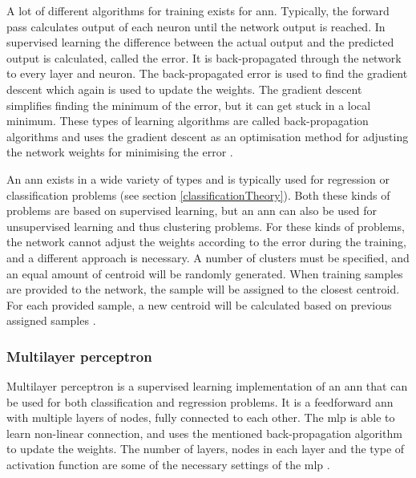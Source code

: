 \documentclass[english, a4paper]{report}
\begin{document}
{{{            \par    
            A lot of different algorithms for training exists for \gls{ann}. Typically, the forward pass calculates output of each neuron until the network output is reached. In supervised learning the difference between the actual output and the predicted output is calculated, called the error. It is back-propagated through the network to every layer and neuron. The back-propagated error is used to find the gradient descent which again is used to update the weights. The gradient descent simplifies finding the minimum of the error, but it can get stuck in a local minimum. These types of learning algorithms are called back-propagation algorithms and uses the gradient descent as an optimisation method for adjusting the network weights for minimising the error \cite{makeNeuralNetwork}.
            \par
            An \gls{ann} exists in a wide variety of types and is typically used for regression or classification problems (see section \ref{classificationTheory}). Both these kinds of problems are based on supervised learning, but an \gls{ann} can also be used for unsupervised learning and thus clustering problems. For these kinds of problems, the network cannot adjust the weights according to the error during the training, and a different approach is necessary. A number of clusters must be specified, and an equal amount of centroid will be randomly generated. When training samples are provided to the network, the sample will be assigned to the closest centroid. For each provided sample, a new centroid will be calculated based on previous assigned samples \cite{artificialIntelligence}.
            
            \subsubsection{Multilayer perceptron}\label{mlp}
            {
                Multilayer perceptron is a supervised learning implementation of an \gls{ann} that can be used for both classification and regression problems. It is a feedforward \gls{ann} with multiple layers of nodes, fully connected to each other. The \gls{mlp} is able to learn non-linear connection, and uses the mentioned back-propagation algorithm to update the weights. The number of layers, nodes in each layer and the type of activation function are some of the necessary settings of the \gls{mlp} \cite{artificialIntelligence}.
            }
        }

}}
\end{document}
